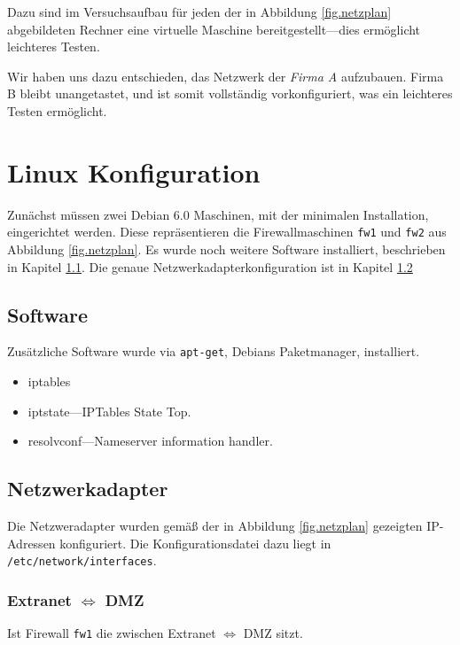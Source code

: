 Dazu sind im Versuchsaufbau für jeden der in Abbildung 
\ref{fig.netzplan} abgebildeten Rechner
eine virtuelle Maschine bereitgestellt---dies ermöglicht leichteres
Testen.

Wir haben uns dazu entschieden, das Netzwerk der \emph{Firma A} aufzubauen.
Firma B bleibt unangetastet, und ist somit vollständig vorkonfiguriert,
was ein leichteres Testen ermöglicht.\cite{labor}


\section{Linux Konfiguration}

Zunächst müssen zwei Debian 6.0 Maschinen,
mit der minimalen Installation, eingerichtet werden.
Diese repräsentieren die Firewallmaschinen {\tt fw1} und {\tt fw2} aus
Abbildung \ref{fig.netzplan}.
Es wurde noch weitere Software installiert,
beschrieben in Kapitel \ref{sec.software}.
Die genaue Netzwerkadapterkonfiguration ist in Kapitel \ref{sec.netzwerk}

\subsection{Software}\label{sec.software}

Zusätzliche Software wurde via {\tt apt-get}, Debians Paketmanager,
installiert.

\begin{itemize}
    \item iptables
    \item iptstate---IPTables State Top.
    \item resolvconf---Nameserver information handler.
\end{itemize}


\subsection{Netzwerkadapter}\label{sec.netzwerk}

Die Netzweradapter wurden gemäß der in Abbildung \ref{fig.netzplan}
gezeigten IP-Adressen konfiguriert.
Die Konfigurationsdatei dazu liegt in {\tt /etc/network/interfaces}.

\subsubsection{Extranet $\Longleftrightarrow$ DMZ}

Ist Firewall {\tt fw1} die zwischen Extranet $\Longleftrightarrow$ DMZ sitzt.

